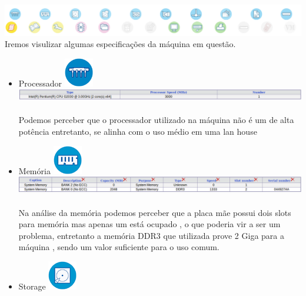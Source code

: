 \documentclass[a4paper]{article}
\begin{document}
  \includegraphics[scale = 0.39]{icones.png}\\
  
  Iremos visulizar algumas especificações da máquina em questão.
  \begin{itemize}
  \item Processador \includegraphics[scale = 1.8]{pro.png}\\
  
  	\includegraphics[scale = 0.4]{process.png}
    \paragraph{}
    Podemos perceber que o processador utilizado na máquina não é um de alta potência entretanto, se alinha com o uso médio em uma lan house
    
  \item Memória \includegraphics[scale = 0.5]{memory.png}\\
  
  	\includegraphics[scale = 0.4]{memoria.png}
	\paragraph{}
    Na análise da memória podemos perceber que a placa mãe possui dois slots para memória mas apenas um está ocupado , o que poderia vir a ser um problema, entretanto a memória DDR3 que utilizada prove 2 Giga para a máquina , sendo um valor suficiente para o uso comum.
\item Storage \includegraphics[scale = 0.5]{stor.png}\\
  

\end{itemize}
\end{document}
